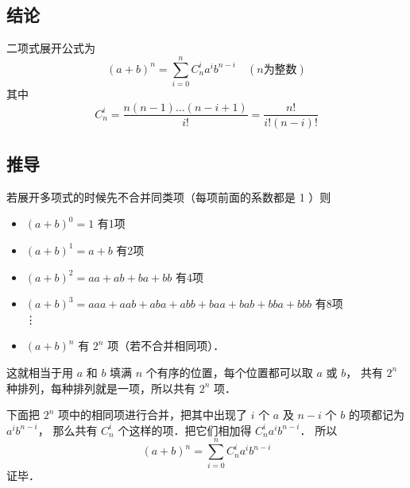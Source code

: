 
\subsection{结论}
二项式展开公式为
\begin{equation}
(a + b)^n = \sum\limits_{i = 0}^n {C_n^i a^i b^{n - i}}\quad (n \text{为整数})
\end{equation}
其中
\begin{equation}
C_n^i = \frac{n(n - 1)\dots (n - i + 1)}{i!} = \frac{n!}{i!(n - i)!}
\end{equation}

\subsection{推导}
若展开多项式的时候先不合并同类项（每项前面的系数都是 1 ）则
\begin{itemize}
\item $(a + b)^0 = 1$ 有1项
\item $(a + b)^1 = a + b$ 有2项
\item $(a + b)^2 = aa + ab + ba + bb$ 有4项
\item $(a + b)^3 = aaa + aab + aba + abb + baa + bab + bba + bbb$ 有8项\\
\qquad \qquad \vdots
\item $(a + b)^n$ 有 $2^n$ 项（若不合并相同项）．
\end{itemize}

这就相当于用 $a$ 和 $b$ 填满 $n$ 个有序的位置，每个位置都可以取 $a$ 或 $b$， 共有 $2^n$ 种排列，每种排列就是一项，所以共有 $2^n$ 项．

下面把 $2^n$ 项中的相同项进行合并，把其中出现了 $i$ 个 $a$ 及 $n-i$ 个 $b$ 的项都记为 $a^i b^{n-i}$， 那么共有 $C_n^i$ 个这样的项．把它们相加得 $C_n^i a^i b^{n-i}$． 所以
\begin{equation}
(a + b)^n = \sum\limits_{i = 0}^n {C_n^i a^i b^{n - i}}
\end{equation}
证毕．